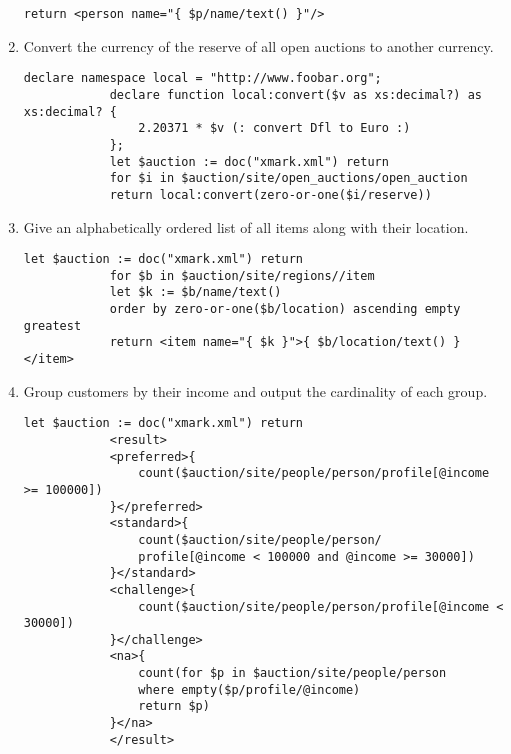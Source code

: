 \begin{enumerate}[label=Q\arabic*.]
\begin{lstlisting}[style=XQuery]
			return <person name="{ $p/name/text() }"/>
		\end{lstlisting}	
		\item %
			Convert the currency of the reserve of all open auctions to another currency.
		\begin{lstlisting}[style=XQuery]
			declare namespace local = "http://www.foobar.org";
			declare function local:convert($v as xs:decimal?) as xs:decimal? {
				2.20371 * $v (: convert Dfl to Euro :)
			};
			let $auction := doc("xmark.xml") return
			for $i in $auction/site/open_auctions/open_auction
			return local:convert(zero-or-one($i/reserve))
		\end{lstlisting}	
		\item %
			Give an alphabetically ordered list of all items along with their location.
		\begin{lstlisting}[style=XQuery]
			let $auction := doc("xmark.xml") return
			for $b in $auction/site/regions//item
			let $k := $b/name/text()
			order by zero-or-one($b/location) ascending empty greatest
			return <item name="{ $k }">{ $b/location/text() }</item>
		\end{lstlisting}	
		\item %
			Group customers by their income and output the cardinality of each group.
		\begin{lstlisting}[style=XQuery]
			let $auction := doc("xmark.xml") return
			<result>
			<preferred>{
				count($auction/site/people/person/profile[@income >= 100000])
			}</preferred>
			<standard>{
				count($auction/site/people/person/
				profile[@income < 100000 and @income >= 30000])
			}</standard>
			<challenge>{
				count($auction/site/people/person/profile[@income < 30000])
			}</challenge>
			<na>{
				count(for $p in $auction/site/people/person
				where empty($p/profile/@income)
				return $p)
			}</na>
			</result>
		\end{lstlisting}
			
		
	\end{enumerate}